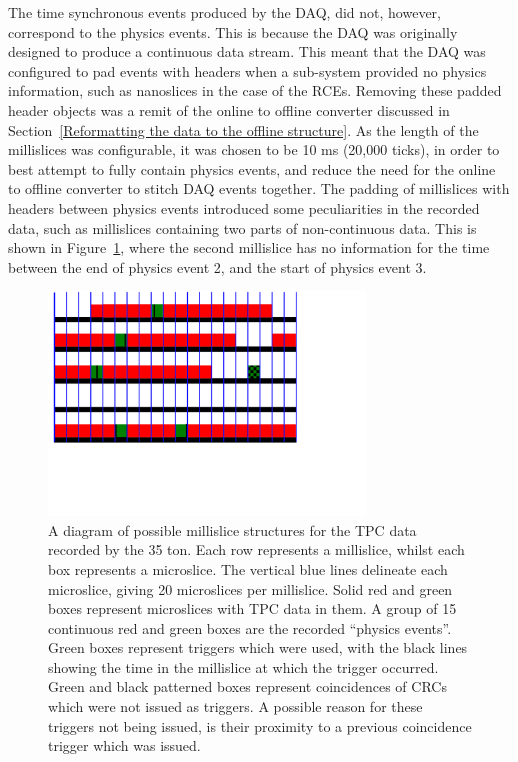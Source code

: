 The time synchronous events produced by the DAQ, did not, however, correspond to the physics events. This is because the DAQ was originally designed to produce a continuous data stream. This meant that the DAQ was configured to pad events with headers when a sub-system provided no physics information, such as nanoslices in the case of the RCEs. Removing these padded header objects was a remit of the online to offline converter discussed in Section~\ref{Reformatting the data to the offline structure}. As the length of the millislices was configurable, it was chosen to be 10 ms (20,000 ticks), in order to best attempt to fully contain physics events, and reduce the need for the online to offline converter to stitch DAQ events together. The padding of millislices with headers between physics events introduced some peculiarities in the recorded data, such as millislices containing two parts of non-continuous data. This is shown in Figure~\ref{fig:DataStructure}, where the second millislice has no information for the time between the end of physics event 2, and the start of physics event 3.\\

\begin{figure}
  \centering
  \includegraphics[width=0.75\textwidth]{DataStructure}
  \caption[The 35 ton data structure]
          {A diagram of possible millislice structures for the TPC data recorded by the 35 ton. Each row represents a millislice, whilst each box represents a microslice. The vertical blue lines delineate each microslice, giving 20 microslices per millislice. Solid red and green boxes represent microslices with TPC data in them. A group of 15 continuous red and green boxes are the recorded ``physics events''. Green boxes represent triggers which were used, with the black lines showing the time in the millislice at which the trigger occurred. Green and black patterned boxes represent coincidences of CRCs which were not issued as triggers. A possible reason for these triggers not being issued, is their proximity to a previous coincidence trigger which was issued.}
  \label{fig:DataStructure}
\end{figure}

